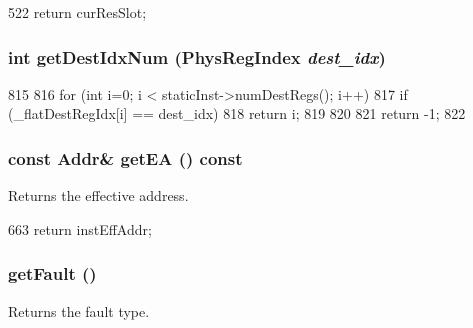 \begin{DoxyCode}
522 { return curResSlot; }
\end{DoxyCode}
\hypertarget{classInOrderDynInst_aa20ecc7091e255ecf38ffd5694b2c974}{
\subsubsection[{getDestIdxNum}]{\setlength{\rightskip}{0pt plus 5cm}int getDestIdxNum ({\bf PhysRegIndex} {\em dest\_\-idx})}}
\label{classInOrderDynInst_aa20ecc7091e255ecf38ffd5694b2c974}



\begin{DoxyCode}
815     {
816         for (int i=0; i < staticInst->numDestRegs(); i++) {
817             if (_flatDestRegIdx[i] == dest_idx)
818                 return i;
819         }
820 
821         return -1;
822     }
\end{DoxyCode}
\hypertarget{classInOrderDynInst_a6fd9d852d5780eb802b4d2520e58747b}{
\subsubsection[{getEA}]{\setlength{\rightskip}{0pt plus 5cm}const {\bf Addr}\& getEA () const}}
\label{classInOrderDynInst_a6fd9d852d5780eb802b4d2520e58747b}
Returns the effective address. 


\begin{DoxyCode}
663 { return instEffAddr; }
\end{DoxyCode}
\hypertarget{classInOrderDynInst_ab9b1142cc382fcfba846b1998e6c2f17}{
\subsubsection[{getFault}]{ getFault ()}}
\label{classInOrderDynInst_ab9b1142cc382fcfba846b1998e6c2f17}
Returns the fault type. 


